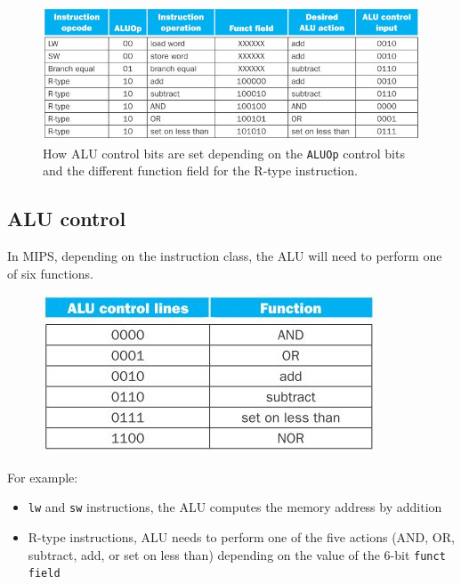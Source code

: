 \documentclass[10pt,a4paper]{article}
\begin{document}
\begin{figure} [h!]
    \centering
    \includegraphics[scale=0.8]{ALU instructions.JPG}
    \caption{How ALU control bits are set depending on the \texttt{ALUOp} control bits and the different function field for the R-type instruction.}
\end{figure}
\subsection{ALU control}

In MIPS, depending on the instruction class, the ALU will need to perform one of six functions.
\begin{figure} [h!]
    \centering
    \includegraphics[scale=0.7]{ALU basic.JPG}
\end{figure}

For example:
\begin{itemize}
    \item \texttt{lw} and \texttt{sw} instructions, the ALU computes the memory address by addition
    \item R-type instructions, ALU needs to perform one of the five actions (AND, OR, subtract, 
    add, or set on less than) depending on the value of the 6-bit \texttt{funct field}
\end{itemize}  

\pagebreak
\end{document}
